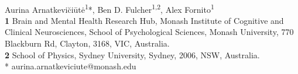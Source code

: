 \documentclass[10pt,A4]{article}
\date{}
\begin{document}
\vspace*{0.2in}
\begin{flushleft}
{\Large
\textbf{} %
}
\newline
\\
Aurina Arnatkevi\u{c}i\={u}t\.{e}\textsuperscript{1}*,
Ben D. Fulcher\textsuperscript{1,2},
Alex Fornito\textsuperscript{1}\\
\bigskip
\textbf{1} Brain and Mental Health Research Hub, Monash Institute of Cognitive and Clinical Neurosciences, School of Psychological Sciences, Monash University, 770 Blackburn Rd, Clayton, 3168, VIC, Australia.\\
\textbf{2} School of Physics, Sydney University, Sydney, 2006, NSW, Australia. \\
\bigskip
%
%
%
%
%
%
* aurina.arnatkeviciute@monash.edu

\end{flushleft}
\end{document}
